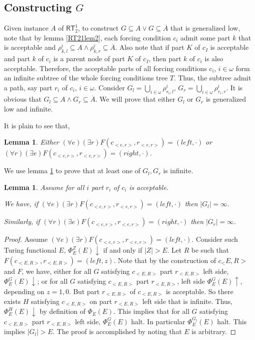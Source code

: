 \documentclass[options]{amsart}
\newtheorem{lemma}[theorem]{Lemma}
\theoremstyle{definition}
\theoremstyle{remark}
\newtheorem{Ramsey's theorem}[theorem]{Ramsey's theorem}
\begin{document}
\subsection{Constructing $G$}\label{RT21subsec2}
Given instance $A$ of
$\mathsf{RT}_2^1$, to construct
 $G\subseteq A\vee G\subseteq
\overline{A}$ that is generalized low,
note that by lemma \ref{RT21lem2},
each forcing condition
$c_i$ admit some part $k$ that is
acceptable and
$\rho^i_{k,l}\subseteq
A\wedge \rho^i_{k,r}\subseteq
\overline{A}$. Also note that
if part $K$ of $c_I$ is acceptable
and part $k$ of $c_i$ is
a parent node of part $K$ of $c_I$,
 then part $k$ of $c_i$ is also
 acceptable.
 Therefore, the acceptable parts
 of all forcing conditions $c_i$,
 $i\in\omega$ form an infinite
 subtree of the whole forcing
 conditions tree $T$. Thus,
 the subtree admit a path, say
 part $r_i$ of $c_i$, $i\in\omega$.
 Consider
 $G_l=\bigcup\limits_{i\in\omega}
 \rho^i_{r_i,l}$,
 $G_r=\bigcup\limits_{i\in\omega}
 \rho^i_{r_i,r}$. It is obvious
 that $G_l\subseteq A\wedge
 G_r\subseteq \overline{A}$.
We will prove that either $G_l$
or $G_r$ is generalized low and infinite.

It is plain to see that,
\begin{lemma}\label{RT21lem4}
Either
$(\forall e)(
\exists r) F(c_{<e,r>},r_{<e,r>})
= (left, \cdot)$
or
$(
\forall r)
(\exists e)
F(c_{<e,r>},r_{<e,r>})
=(right, \cdot)$.

\end{lemma}
We use lemma \ref{RT21lem4}
to prove that at least one of
$G_l,G_r$ is infinite.
\begin{lemma}\label{RT21lem5}
Assume for all $i$
part $r_i$ of $c_i$
is acceptable.

We have, if
$(\forall e)(
\exists r) F(c_{<e,r>},r_{<e,r>})
= (left, \cdot)$ then
$|G_l|=\infty$.

Similarly,
if
$(\forall r)(
\exists e) F(c_{<e,r>},r_{<e,r>})
= (right, \cdot)$ then
$|G_r|=\infty$.

\end{lemma}
\begin{proof}
Assume $(\forall e)(
\exists r) F(c_{<e,r>},r_{<e,r>})
= (left, \cdot)$.
Consider such Turing functional
$E$, $\Phi_E^Z(E)\downarrow$
if and only if $|Z|>E$.
Let $R$ be such that
$F(c_{<E,R>},r_{<E,R>}) =
(left,z)$.
Note that by the construction
of $c_<E,R>$ and $F$,
we have,
either
for all $G$ satisfying
$c_{<E,R>}$ part $r_{<E,R>}$
left side,
$\Phi_E^G(E)\downarrow$;
or
for all $G$ satisfying
$c_{<E,R>}$ part $r_{<E,R>}$,
left side $\Phi_E^G(E)\uparrow$,
depending on $z=1,0$.
But part $r_{<E,R>}$ of
$c_{<E,R>}$ is acceptable.
So there exists
$H$ satisfying $c_{<E,R>}$ on
part $r_{<E,R>}$ left side
that is infinite.
Thus, $\Phi_E^H(E)\downarrow$
by definition of $\Phi_E(E)$.
This implies that for all $G$ satisfying
$c_{<E,R>}$ part $r_{<E,R>}$ left side,
$\Phi_E^G(E)$ halt.
In particular
$\Phi_E^{G_l}(E)$ halt.
This implies $|G_l|>E$.
The proof  is accomplished by noting
that $E$ is arbitrary.

\end{proof}
\end{document}

